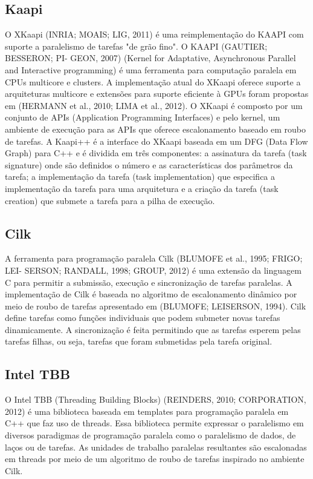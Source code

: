 \subsection{Kaapi}

O XKaapi (INRIA; MOAIS; LIG, 2011) é uma reimplementação do KAAPI com suporte a paralelismo de tarefas "de grão fino". O KAAPI (GAUTIER; BESSERON; PI- GEON, 2007) (Kernel for Adaptative, Asynchronous Parallel and Interactive programming) é uma ferramenta para computação paralela em CPUs multicore e clusters. A implementação atual do XKaapi oferece suporte a arquiteturas multicore e extensões para suporte eficiente à GPUs foram propostas em (HERMANN et al., 2010; LIMA et al., 2012). O XKaapi é composto por um conjunto de APIs (Application Programming Interfaces) e pelo kernel, um ambiente de execução para as APIs que oferece escalonamento baseado em roubo de tarefas. A Kaapi++ é a interface do XKaapi baseada em um DFG (Data Flow Graph) para C++ e é dividida em três componentes: a assinatura da tarefa (task signature) onde são definidos o número e as características dos parâmetros da tarefa; a implementação da tarefa (task implementation) que especifica a implementação da tarefa para uma arquitetura e a criação da tarefa (task creation) que submete a tarefa para a pilha de execução.

\subsection{Cilk}

A ferramenta para programação paralela Cilk (BLUMOFE et al., 1995; FRIGO; LEI- SERSON; RANDALL, 1998; GROUP, 2012) é uma extensão da linguagem C para permitir a submissão, execução e sincronização de tarefas paralelas. A implementação de Cilk é baseada no algoritmo de escalonamento dinâmico por meio de roubo de tarefas apresentado em (BLUMOFE; LEISERSON, 1994). Cilk define tarefas como funções individuais que podem submeter novas tarefas dinamicamente. A sincronização é feita permitindo que as tarefas esperem pelas tarefas filhas, ou seja, tarefas que foram submetidas pela tarefa original.


\subsection{Intel TBB}

O Intel TBB (Threading Building Blocks) (REINDERS, 2010; CORPORATION, 2012) é uma biblioteca baseada em templates para programação paralela em C++ que faz uso de threads. Essa biblioteca permite expressar o paralelismo em diversos paradigmas de programação paralela como o paralelismo de dados, de laços ou de tarefas. As unidades de trabalho paralelas resultantes são escalonadas em threads por meio de um algoritmo de roubo de tarefas inspirado no ambiente Cilk.

